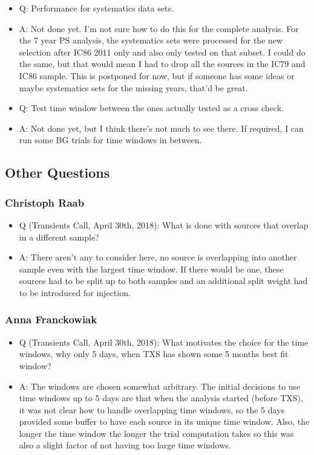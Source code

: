 \begin{itemize}
      \item Q:
        Performance for systematics data sets.
      \item A:
        \textcolor{nordorange}{Not done yet}.
        I'm not sure how to do this for the complete analysis.
        For the 7 year PS analysis, the systematics sets were processed for the new selection after IC86 2011 only and also only tested on that subset.
        I could do the same, but that would mean I had to drop all the sources in the IC79 and IC86 sample.
        This is postponed for now, but if someone has some ideas or maybe systematics sets for the missing years, that'd be great.

      \item Q:
        Test time window between the ones actually tested as a cross check.
      \item A:
        \textcolor{nordorange}{Not done yet}, but I think there's not much to see there.
        If required, I can run some BG trials for time windows in between.
  \end{itemize}

\subsection*{Other Questions}
\subsubsection*{Christoph Raab}
  \begin{itemize}
      \item Q (Transients Call, April 30th, 2018):
        What is done with sources that overlap in a different sample?
      \item A:
        There aren't any to consider here, no source is overlapping into another sample even with the largest time window.
        If there would be one, these sources had to be split up to both samples and an additional split weight had to be introduced for injection.
  \end{itemize}

\subsubsection*{Anna Franckowiak}
  \begin{itemize}
      \item Q (Transients Call, April 30th, 2018):
        What motivates the choice for the time windows, why only 5 days, when TXS has shown some 5 months best fit window?
      \item A:
        The windows are chosen somewhat arbitrary.
        The initial decisions to use time windows up to 5 days are that when the analysis started (before TXS), it was not clear how to handle overlapping time windows, so the 5 days provided some buffer to have each source in its unique time window.
        Also, the longer the time window the longer the trial computation takes so this was also a slight factor of not having too large time windows.
  \end{itemize}




